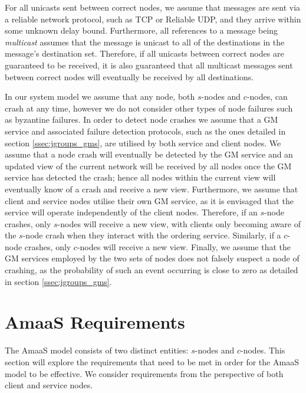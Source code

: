     For all unicasts sent between correct nodes, we assume that messages are sent via a reliable network protocol, such as TCP\citep{Cerf:2005:PPN:1064413.1064423} or Reliable UDP\citep{ReliableUDP}, and they arrive within some unknown delay bound.   Furthermore, all references to a message being \emph{multicast} assumes that the message is unicast to all of the destinations in the message's destination set.  Therefore, if all unicasts between correct nodes are guaranteed to be received, it is also guaranteed that all multicast messages sent between correct nodes will eventually be received by all destinations.  
		
    In our system model we assume that any node, both $s$-nodes and $c$-nodes, can crash at any time, however we do not consider other types of node failures such as byzantine failures.  In order to detect node crashes we assume that a GM service and associated failure detection protocols, such as the ones detailed in section \ref{ssec:jgroups_gms}, are utilised by both service and client nodes.  We assume that a node crash will eventually be detected by the GM service and an updated view of the current network will be received by all nodes once the GM service has detected the crash; hence all nodes within the current view will eventually know of a crash and receive a new view.  Furthermore, we assume that client and service nodes utilise their own GM service, as it is envisaged that the service will operate independently of the client nodes.  Therefore, if an $s$-node crashes, only $s$-nodes will receive a new view, with clients only becoming aware of the $s$-node crash when they interact with the ordering service.  Similarly, if a $c$-node crashes, only $c$-nodes will receive a new view.  Finally, we assume that the GM services employed by the two sets of nodes does not falsely suspect a node of crashing, as the probability of such an event occurring is close to zero as detailed in section \ref{ssec:jgroups_gms}.  
    
	
\section{AmaaS Requirements}\label{sec:absaas_requirements}
The \textsf{AmaaS} model consists of two distinct entities: $s$-nodes and $c$-nodes.  This section will explore the requirements that need to be met in order for the \textsf{AmaaS} model to be effective.  We consider requirements from the perspective of both client and service nodes.

